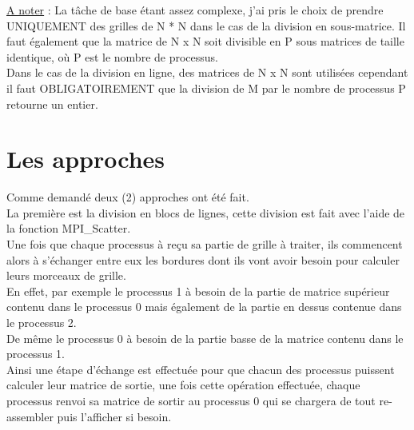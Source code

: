 \documentclass[10pt,a4paper]{article}
\begin{document}
\underline{A noter} : La tâche de base étant assez complexe, j'ai pris le choix de prendre UNIQUEMENT des grilles de N * N dans le cas de la division en sous-matrice. Il faut également que la matrice de N x N soit divisible en P sous matrices de taille identique, où P est le nombre de processus.\\
Dans le cas de la division en ligne, des matrices de N x N sont utilisées cependant il faut OBLIGATOIREMENT que la division de M par le nombre de processus P retourne un entier. 

\section{Les approches}
Comme demandé deux (2) approches ont été fait. \\
\indent La première est la division en blocs de lignes, cette division est fait avec l'aide de la fonction MPI\_Scatter. \\
Une fois que chaque processus à reçu sa partie de grille à traiter, ils commencent alors à s'échanger entre eux les bordures dont ils vont avoir besoin pour calculer leurs morceaux de grille. \\
En effet, par exemple le processus 1 à besoin de la partie de matrice supérieur contenu dans le processus 0 mais également de la partie en dessus contenue dans le processus 2. \\
De même le processus 0 à besoin de la partie basse de la matrice contenu dans le processus 1. \\

Ainsi une étape d'échange est effectuée pour que chacun des processus puissent calculer leur matrice de sortie, une fois cette opération effectuée, chaque processus renvoi sa matrice de sortir au processus 0 qui se chargera de tout re-assembler puis l'afficher si besoin. \\
\end{document}
